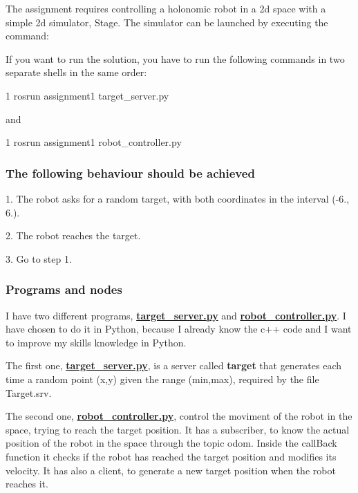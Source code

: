 The assignment requires controlling a holonomic robot in a 2d space with a simple 2d simulator, Stage. The simulator can be launched by executing the command\+:




If you want to run the solution, you have to run the following commands in two separate shells in the same order\+:


\begin{DoxyCode}
1 rosrun assignment1 target\_server.py
\end{DoxyCode}


and


\begin{DoxyCode}
1 rosrun assignment1 robot\_controller.py 
\end{DoxyCode}


\subsubsection*{The following behaviour should be achieved}


\begin{DoxyItemize}
\item 1. The robot asks for a random target, with both coordinates in the interval (-\/6., 6.).
\item 2. The robot reaches the target.
\item 3. Go to step 1.
\end{DoxyItemize}

\subsubsection*{Programs and nodes}


\begin{DoxyItemize}
\item I have two different programs, {\bfseries \hyperlink{target__server_8py}{target\+\_\+server.\+py}} and {\bfseries \hyperlink{robot__controller_8py}{robot\+\_\+controller.\+py}}. I have chosen to do it in Python, because I already know the c++ code and I want to improve my skills knowledge in Python.
\item The first one, {\bfseries \hyperlink{target__server_8py}{target\+\_\+server.\+py}}, is a server called {\bfseries target} that generates each time a random point (x,y) given the range (min,max), required by the file Target.\+srv.
\item The second one, {\bfseries \hyperlink{robot__controller_8py}{robot\+\_\+controller.\+py}}, control the moviment of the robot in the space, trying to reach the target position. It has a subscriber, to know the actual position of the robot in the space through the topic odom. Inside the call\+Back function it checks if the robot has reached the target position and modifies its velocity. It has also a client, to generate a new target position when the robot reaches it.
\end{DoxyItemize}

